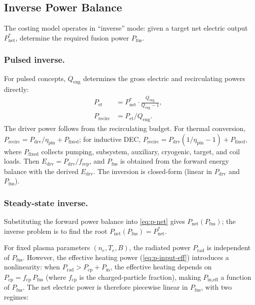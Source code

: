 \documentclass{article}
\begin{document}
\subsection{Inverse Power Balance}
\label{sec:inverse-balance}

The costing model operates in ``inverse'' mode: given a target net
electric output $P_{\text{net}}^*$, determine the required fusion power
$P_{\text{fus}}$.

\subsubsection{Pulsed inverse.}
For pulsed concepts, $Q_{\text{eng}}$ determines the gross electric and
recirculating powers directly:
\begin{align}
P_{\text{et}} &= P_{\text{net}}^* \cdot \frac{Q_{\text{eng}}}{Q_{\text{eng}} - 1}, \\
P_{\text{recirc}} &= P_{\text{et}} / Q_{\text{eng}}.
\end{align}
The driver power follows from the recirculating budget.  For thermal
conversion, $P_{\text{recirc}} = P_{\text{drv}}/\eta_{\text{pin}}
+ P_{\text{fixed}}$; for inductive DEC,
$P_{\text{recirc}} = P_{\text{drv}}(1/\eta_{\text{pin}} - 1)
+ P_{\text{fixed}}$, where $P_{\text{fixed}}$ collects
pumping, subsystem, auxiliary, cryogenic, target, and coil loads.
Then $E_{\text{drv}} = P_{\text{drv}} / f_{\text{rep}}$, and
$P_{\text{fus}}$ is obtained from the forward energy balance
with the derived $E_{\text{drv}}$.  The inversion is closed-form
(linear in $P_{\text{drv}}$ and $P_{\text{fus}}$).

\subsubsection{Steady-state inverse.}  Substituting the forward power balance into
\cref{eq:p-net} gives $P_{\text{net}}(P_{\text{fus}})$; the inverse
problem is to find the root
$P_{\text{net}}(P_{\text{fus}}) = P_{\text{net}}^*$.

For fixed plasma parameters $(n_e, T_e, B)$, the radiated power
$P_{\text{rad}}$ is independent of $P_{\text{fus}}$.  However, the
effective heating power (\cref{eq:p-input-eff}) introduces a
nonlinearity: when $P_{\text{rad}} > P_{\text{cp}} + P_{\text{in}}$,
the effective heating depends on $P_{\text{cp}} = f_{\text{cp}} \,
P_{\text{fus}}$ (where $f_{\text{cp}}$ is the charged-particle
fraction), making $P_{\text{in,eff}}$ a function of $P_{\text{fus}}$.
The net electric power is therefore piecewise linear in
$P_{\text{fus}}$, with two regimes:
\end{document}
